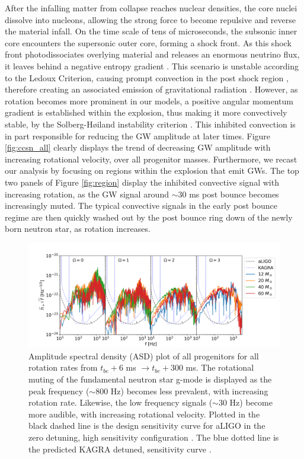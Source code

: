 \documentclass[twocolumn,times]{aastex62}  %
\begin{document}
 After the infalling matter from collapse reaches nuclear densities, the core nuclei dissolve into nucleons, allowing the strong force to become repulsive and reverse the material infall.  On the time scale of tens of microseconds, the subsonic inner core encounters the supersonic outer core, forming a shock front.  As this shock front photodissociates overlying material and releases an enormous neutrino flux, it leaves behind a negative entropy gradient \citep{mazurek:1982,bruenn:1985,bruenn:1989}.  This scenario is unstable according to the Ledoux Criterion, causing prompt convection in the post shock region \citep{burrows:1992} , therefore creating an associated emission of gravitational radiation \citep{marek:2009b,ott:2009}.  However, as rotation becomes more prominent in our models, a positive angular momentum gradient is established within the explosion, thus making it more convectively stable, by the Solberg-H{\o}iland instability criterion \citep{endal:1978,fryer:2000}.  This inhibited convection is in part responsible for reducing the GW amplitude at later times.  Figure \ref{fig:ccsn_all} clearly displays the trend of decreasing GW amplitude with increasing rotational velocity, over all progenitor masses.  Furthermore, we recast our analysis by focusing on regions within the explosion that emit GWs.  The top two panels of Figure \ref{fig:region} display the inhibited convective signal with increasing rotation, as the GW signal around $\sim$30 ms post bounce becomes increasingly muted.  The typical convective signals in the early post bounce regime are then quickly washed out by the post bounce ring down of the newly born neutron star, as rotation increases.   
\begin{figure}[t!]
  \centering     %
  \includegraphics[width=\textwidth]{figures/tbe6tbe300_M1_long.png}
  \caption{Amplitude spectral density (ASD) plot of all progenitors for all rotation rates from $t_{be}+6$ ms $\rightarrow t_{be}+300$ ms.  The rotational muting of the fundamental neutron star g-mode is displayed as the peak frequency ($\sim 800$ Hz) becomes less prevalent, with increasing rotation rate.  Likewise, the low frequency signals ($\sim30$ Hz) become more audible, with increasing rotational velocity.  Plotted in the black dashed line is the design sensitivity curve for aLIGO in the zero detuning, high sensitivity configuration \citep{barsotti:2018}.  The blue dotted line is the predicted KAGRA detuned, sensitivity curve \citep{komari:2017}.}
  \label{fig:spetra_long}
\end{figure}
\end{document}
